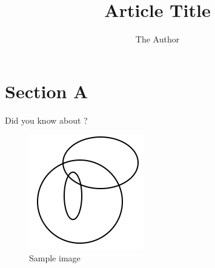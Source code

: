 \documentclass[]{article}
\title{Article Title}
\author{The Author}
\begin{document}
	
	\maketitle
	
	\begin{abstract}
		\blindtext
	\end{abstract}


    \clearpage
	\section{Section A}
	
	Did you know about \cite{wilde}?
	
	\blindtext
	
	\begin{figure}[H]
		\centering
		\includegraphics[width=5cm]{image.png}
		\caption{Sample image}
	\end{figure}

	\blindtext
	
    
	\clearpage
	\printbibliography
\end{document}
